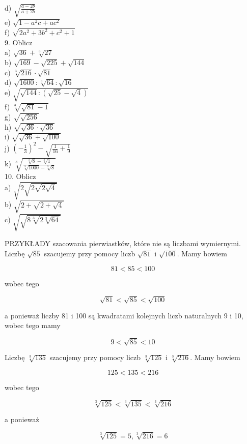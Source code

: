 \documentclass[10pt]{article}
\begin{document}
d) \(\sqrt{\frac{a-2 b}{a+2 b}}\)\\
e) \(\sqrt{1-a^{2} c+a c^{2}}\)\\
f) \(\sqrt{2 a^{2}+3 b^{2}+c^{2}+1}\)\\
9. Oblicz\\
a) \(\sqrt{36}+\sqrt[3]{27}\)\\
b) \(\sqrt{169}-\sqrt{225}+\sqrt{144}\)\\
c) \(\sqrt[3]{216} \cdot \sqrt{81}\)\\
d) \(\sqrt{1600}: \sqrt[3]{64}: \sqrt{16}\)\\
e) \(\sqrt{\sqrt{144}:(\sqrt{25}-\sqrt{4})}\)\\
f) \(\sqrt[3]{\sqrt{81}-1}\)\\
g) \(\sqrt{\sqrt{256}}\)\\
h) \(\sqrt{\sqrt{36} \cdot \sqrt{36}}\)\\
i) \(\sqrt{\sqrt{36}+\sqrt{100}}\)\\
j) \(\left(-\frac{1}{3}\right)^{2}-\sqrt{\frac{1}{16}+\frac{1}{9}}\)\\
k) \(\sqrt[3]{\frac{\sqrt[3]{8}-\sqrt[3]{1}}{\sqrt[3]{1000}-\sqrt[3]{8}}}\)\\
10. Oblicz\\
a) \(\sqrt{2 \sqrt{2 \sqrt{2 \sqrt{4}}}}\)\\
b) \(\sqrt{2+\sqrt{2+\sqrt{4}}}\)\\
c) \(\sqrt{\sqrt{8 \sqrt[3]{2 \sqrt[3]{64}}}}\)

PRZYKŁADY szacowania pierwiastków, które nie są liczbami wymiernymi.\\
Liczbę \(\sqrt{85}\) szacujemy przy pomocy liczb \(\sqrt{81}\) i \(\sqrt{100}\). Mamy bowiem

\[
81<85<100
\]

wobec tego

\[
\sqrt{81}<\sqrt{85}<\sqrt{100}
\]

a ponieważ liczby 81 i 100 są kwadratami kolejnych liczb naturalnych 9 i 10, wobec tego mamy

\[
9<\sqrt{85}<10
\]

Liczbę \(\sqrt[3]{135}\) szacujemy przy pomocy liczb \(\sqrt[3]{125}\) i \(\sqrt[3]{216}\). Mamy bowiem

\[
125<135<216
\]

wobec tego

\[
\sqrt[3]{125}<\sqrt[3]{135}<\sqrt[3]{216}
\]

a ponieważ

\[
\sqrt[3]{125}=5, \sqrt[3]{216}=6
\]
\end{document}
